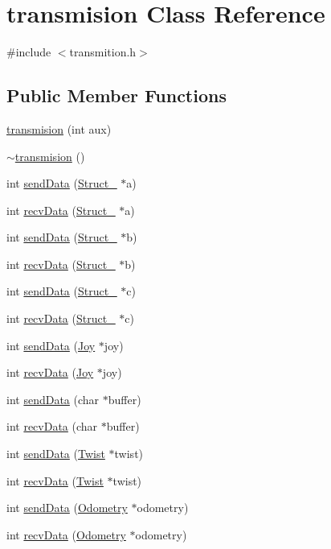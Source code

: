 \hypertarget{classtransmision}{
\section{transmision Class Reference}
\label{classtransmision}
}


{\ttfamily \#include $<$transmition.h$>$}

\subsection*{Public Member Functions}
\begin{DoxyCompactItemize}
\item 
\hyperlink{classtransmision_a9cbd838625edd4d839b03bc1236a2ca2}{transmision} (int aux)
\item 
\hyperlink{classtransmision_ae7d8d3fccee4ddb493e97061c5811cad}{$\sim$transmision} ()
\item 
int \hyperlink{classtransmision_aafa9957efe4d2fc1472a5b298650122d}{sendData} (\hyperlink{structStruct__1}{Struct\_} $\ast$a)
\item 
int \hyperlink{classtransmision_a1dbf734bad68289da9ec9bf0b28000f7}{recvData} (\hyperlink{structStruct__1}{Struct\_} $\ast$a)
\item 
int \hyperlink{classtransmision_a30a3f43077162e430096e9415749d31c}{sendData} (\hyperlink{structStruct__2}{Struct\_} $\ast$b)
\item 
int \hyperlink{classtransmision_a905e696047472384fdd47c962be55e72}{recvData} (\hyperlink{structStruct__2}{Struct\_} $\ast$b)
\item 
int \hyperlink{classtransmision_a1d6f5d22ea3139d9580bd489e78c15b5}{sendData} (\hyperlink{structStruct__3}{Struct\_} $\ast$c)
\item 
int \hyperlink{classtransmision_a81218832d0a18422027503d1b529ac3c}{recvData} (\hyperlink{structStruct__3}{Struct\_} $\ast$c)
\item 
int \hyperlink{classtransmision_a07a6ca5245553367f31662bb9ae9ce5c}{sendData} (\hyperlink{structJoy}{Joy} $\ast$joy)
\item 
int \hyperlink{classtransmision_ab200238f23c207a2acdcbfa44facf5ba}{recvData} (\hyperlink{structJoy}{Joy} $\ast$joy)
\item 
int \hyperlink{classtransmision_af76f07480f2cb76eedc2d3db45bd3aa0}{sendData} (char $\ast$buffer)
\item 
int \hyperlink{classtransmision_a1af0251c8c9487dc6feff1075bb7bee2}{recvData} (char $\ast$buffer)
\item 
int \hyperlink{classtransmision_a23c12d04eab4a7bd583a3b376c4c8fd3}{sendData} (\hyperlink{structTwist}{Twist} $\ast$twist)
\item 
int \hyperlink{classtransmision_a89c0adf9833c7d42be1fcd1c7dc978e0}{recvData} (\hyperlink{structTwist}{Twist} $\ast$twist)
\item 
int \hyperlink{classtransmision_a383ce5304c45dc09b7c994b9708dc6b2}{sendData} (\hyperlink{structOdometry}{Odometry} $\ast$odometry)
\item 
int \hyperlink{classtransmision_ad1079ca1013063468528715ded83851e}{recvData} (\hyperlink{structOdometry}{Odometry} $\ast$odometry)
\end{DoxyCompactItemize}
